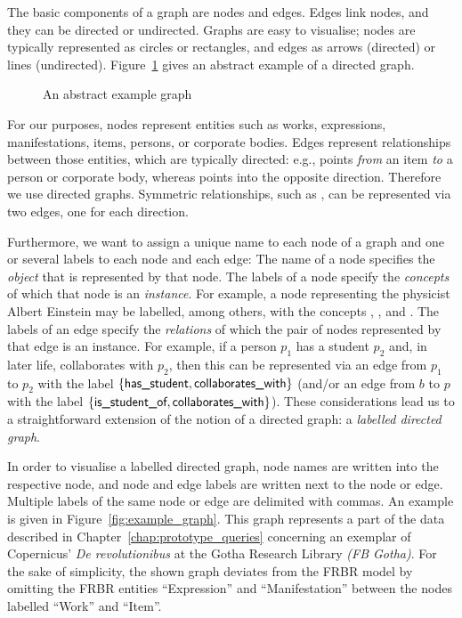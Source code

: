 The basic components of a graph are nodes and edges. Edges link nodes, and they can be directed
or undirected. Graphs are easy to visualise; nodes are typically represented as circles
or rectangles, and edges as arrows (directed) or lines (undirected).
Figure~\ref{fig:example_graph_abstract} gives an abstract example of a directed graph.
%
\begin{figure}[ht]
  \centering
  \caption{An abstract example graph}
  \label{fig:example_graph_abstract}
\end{figure}
%
For our purposes,
nodes represent entities such as works, expressions, manifestations, items,
persons, or corporate bodies.
Edges represent relationships between those entities, which are typically directed:
e.g.,  points \emph{from} an item
\emph{to} a person or corporate body,
whereas  points into the opposite direction.
Therefore we use directed graphs.
Symmetric relationships, such as ,
can be represented via two edges, one for each direction.

Furthermore, we want to assign a unique name to each node of a graph
and one or several labels to each node and each edge:
The name of a node specifies the \emph{object} that is represented by that node.
The labels of a node specify the \emph{concepts}
of which that node is an \emph{instance}.
For example, a node representing the physicist Albert Einstein
may be labelled, among others, with the concepts , ,
and .
The labels of an edge specify the \emph{relations} of which the pair of nodes
represented by that edge is an instance.
For example, if a person $p_1$ has a student $p_2$ and, in later life, 
collaborates with $p_2$, then this can be represented via an edge from $p_1$ to $p_2$
with the label $\{\textsf{has\_student},\textsf{collaborates\_with}\}$
(and/or an edge from $b$ to $p$ with the label $\{\textsf{is\_student\_of},\textsf{collaborates\_with}\}$).
These considerations lead us to a straightforward extension
of the notion of a directed graph:
a \emph{labelled directed graph}.


In order to visualise a labelled directed graph,
node names are written into the respective node,
and node and edge labels are written next to the node or edge.
Multiple labels of the same node or edge are delimited with commas.
An example is given in Figure~\ref{fig:example_graph}.
This graph represents a part of the data described in Chapter~\ref{chap:prototype_queries}
concerning an exemplar of Copernicus' \emph{De revolutionibus} at the
Gotha Research Library \emph{(FB Gotha)}.
For the sake of simplicity, the shown graph deviates from the FRBR model
by omitting the FRBR entities \enquote{Expression} and \enquote{Manifestation}
between the nodes labelled \enquote{Work} and \enquote{Item}.

